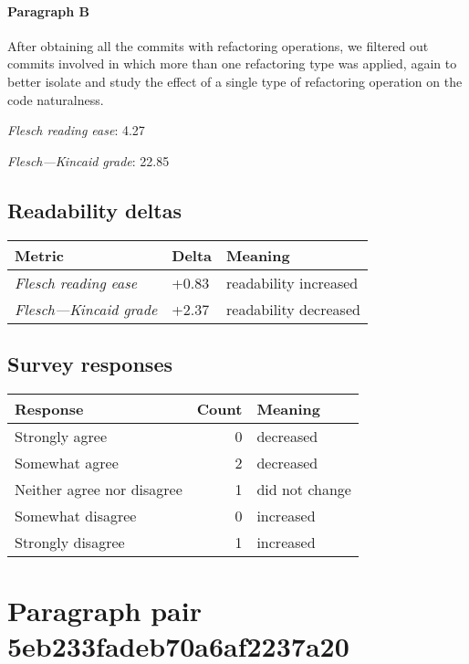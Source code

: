 \paragraph{Paragraph B}
After obtaining all the commits with refactoring operations, we filtered out commits involved in which more than one refactoring type was applied, again to better isolate and study the effect of a single type of refactoring operation on the code naturalness.\par\medskip
\emph{Flesch reading ease}: 4.27\par
\emph{Flesch---Kincaid grade}: 22.85

\subsection{Readability deltas}

\begin{tabular}{lll}
\toprule
               \textbf{Metric} & \textbf{Delta} &       \textbf{Meaning} \\
\midrule
    \emph{Flesch reading ease} &          +0.83 &  readability increased \\
 \emph{Flesch---Kincaid grade} &          +2.37 &  readability decreased \\
\bottomrule
\end{tabular}

\subsection{Survey responses}
\begin{tabular}{lrl}
\toprule
          \textbf{Response} &  \textbf{Count} & \textbf{Meaning} \\
\midrule
             Strongly agree &               0 &        decreased \\
             Somewhat agree &               2 &        decreased \\
 Neither agree nor disagree &               1 &   did not change \\
          Somewhat disagree &               0 &        increased \\
          Strongly disagree &               1 &        increased \\
\bottomrule
\end{tabular}

\section{Paragraph pair 5eb233fadeb70a6af2237a20}
